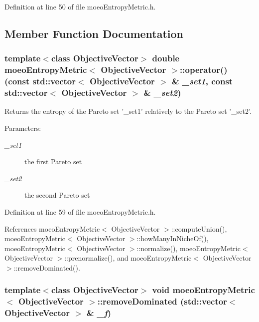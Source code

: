 Definition at line 50 of file moeo\-Entropy\-Metric.h.

\subsection{Member Function Documentation}
\subsubsection{\setlength{\rightskip}{0pt plus 5cm}template$<$class Objective\-Vector$>$ double \bf{moeo\-Entropy\-Metric}$<$ Objective\-Vector $>$::operator() (const std::vector$<$ Objective\-Vector $>$ \& {\em \_\-set1}, const std::vector$<$ Objective\-Vector $>$ \& {\em \_\-set2})\hspace{0.3cm}{\tt  [inline]}}\label{classmoeoEntropyMetric_191a8cdda7873e20338e678c5a7b927b}


Returns the entropy of the Pareto set '\_\-set1' relatively to the Pareto set '\_\-set2'. 

\begin{Desc}
\item[Parameters:]
\begin{description}
\item[{\em \_\-set1}]the first Pareto set \item[{\em \_\-set2}]the second Pareto set \end{description}
\end{Desc}


Definition at line 59 of file moeo\-Entropy\-Metric.h.

References moeo\-Entropy\-Metric$<$ Objective\-Vector $>$::compute\-Union(), moeo\-Entropy\-Metric$<$ Objective\-Vector $>$::how\-Many\-In\-Niche\-Of(), moeo\-Entropy\-Metric$<$ Objective\-Vector $>$::normalize(), moeo\-Entropy\-Metric$<$ Objective\-Vector $>$::prenormalize(), and moeo\-Entropy\-Metric$<$ Objective\-Vector $>$::remove\-Dominated().
\subsubsection{\setlength{\rightskip}{0pt plus 5cm}template$<$class Objective\-Vector$>$ void \bf{moeo\-Entropy\-Metric}$<$ Objective\-Vector $>$::remove\-Dominated (std::vector$<$ Objective\-Vector $>$ \& {\em \_\-f})\hspace{0.3cm}{\tt  [inline, private]}}\label{classmoeoEntropyMetric_198a717fd0bab0bb91346399c1021f82}



